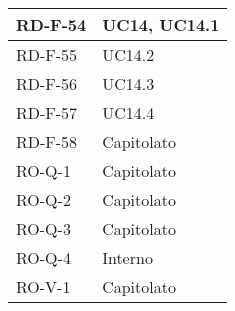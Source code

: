 \begin{center}
\begin{tabular}{ |m{8em}|m{13em}| }
    \hline
    RD-F-54  &  UC14, UC14.1 \\
    \hline
    RD-F-55  &  UC14.2 \\
    \hline
    RD-F-56  &  UC14.3 \\
    \hline
    RD-F-57  &  UC14.4 \\
    \hline
    RD-F-58  &  Capitolato \\
    \hline
    RO-Q-1  &  Capitolato \\
    \hline
    RO-Q-2  &  Capitolato \\
    \hline
    RO-Q-3  &  Capitolato \\
    \hline
    RO-Q-4  &  Interno \\
    \hline
    RO-V-1  &  Capitolato \\
    \hline
\end{tabular}
\end{center}